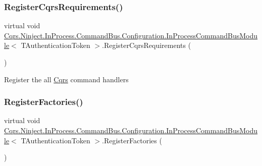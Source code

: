 \subsubsection{\texorpdfstring{Register\+Cqrs\+Requirements()}{RegisterCqrsRequirements()}}
{\footnotesize\ttfamily virtual void \hyperlink{classCqrs_1_1Ninject_1_1InProcess_1_1CommandBus_1_1Configuration_1_1InProcessCommandBusModule}{Cqrs.\+Ninject.\+In\+Process.\+Command\+Bus.\+Configuration.\+In\+Process\+Command\+Bus\+Module}$<$ T\+Authentication\+Token $>$.Register\+Cqrs\+Requirements (\begin{DoxyParamCaption}{ }\end{DoxyParamCaption})\hspace{0.3cm}{\ttfamily [virtual]}}



Register the all \hyperlink{namespaceCqrs}{Cqrs} command handlers 

\mbox{\label{classCqrs_1_1Ninject_1_1InProcess_1_1CommandBus_1_1Configuration_1_1InProcessCommandBusModule_a41d6205a5bc9b85d4dde0798b63bd092_a41d6205a5bc9b85d4dde0798b63bd092}} 
\subsubsection{\texorpdfstring{Register\+Factories()}{RegisterFactories()}}
{\footnotesize\ttfamily virtual void \hyperlink{classCqrs_1_1Ninject_1_1InProcess_1_1CommandBus_1_1Configuration_1_1InProcessCommandBusModule}{Cqrs.\+Ninject.\+In\+Process.\+Command\+Bus.\+Configuration.\+In\+Process\+Command\+Bus\+Module}$<$ T\+Authentication\+Token $>$.Register\+Factories (\begin{DoxyParamCaption}{ }\end{DoxyParamCaption})\hspace{0.3cm}{\ttfamily [virtual]}}



